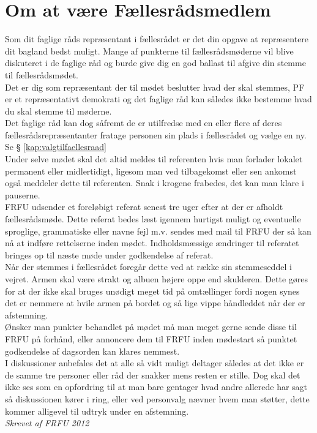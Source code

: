 \section*{Om at være Fællesrådsmedlem}
Som dit faglige råds repræsentant i fællesrådet er det din opgave at repræsentere dit bagland bedst muligt. Mange af punkterne til fællesrådsmøderne vil blive diskuteret i de faglige råd og burde give dig en god ballast til afgive din stemme til fællesrådsmødet.\\

Det er dig som repræsentant der til mødet beslutter hvad der skal stemmes, PF er et repræsentativt demokrati og det faglige råd kan således ikke bestemme hvad du skal stemme til møderne.\\
Det faglige råd kan dog såfremt de er utilfredse med en eller flere af deres fællesrådsrepræsentanter fratage personen sin plads i fællesrådet og vælge en ny. Se § \ref{kap:valgtilfaellesraad}\\

Under selve mødet skal det altid meldes til referenten hvis man forlader lokalet permanent eller midlertidigt, ligesom man ved tilbagekomst eller sen ankomst også meddeler dette til referenten.
Snak i krogene frabedes, det kan man klare i pauserne.\\

FRFU udsender et foreløbigt referat senest tre uger efter at der er afholdt fællesrådsmøde. Dette referat bedes læst igennem hurtigst muligt og eventuelle sproglige, grammatiske eller navne fejl m.v. sendes med mail til FRFU der så kan nå at indføre rettelserne inden mødet. Indholdsmæssige ændringer til referatet bringes op til næste møde under godkendelse af referat.\\

Når der stemmes i fællesrådet foregår dette ved at række sin stemmeseddel i vejret. Armen skal være strakt og albuen højere oppe end skulderen. Dette gøres for at der ikke skal bruges unødigt meget tid på omtællinger fordi nogen synes det er nemmere at hvile armen på bordet og så lige vippe håndleddet når der er afstemning.\\

Ønsker man punkter behandlet på mødet må man meget gerne sende disse til FRFU på forhånd, eller annoncere dem til FRFU inden mødestart så punktet godkendelse af dagsorden kan klares nemmest.\\
I diskussioner anbefales det at alle så vidt muligt deltager således at det ikke er de samme tre personer eller råd der snakker mens resten er stille. Dog skal det ikke ses som en opfordring til at man bare gentager hvad andre allerede har sagt så diskussionen kører i ring, eller ved personvalg nævner hvem man støtter, dette kommer alligevel til udtryk under en afstemning.
\\
\textit{Skrevet af FRFU 2012}